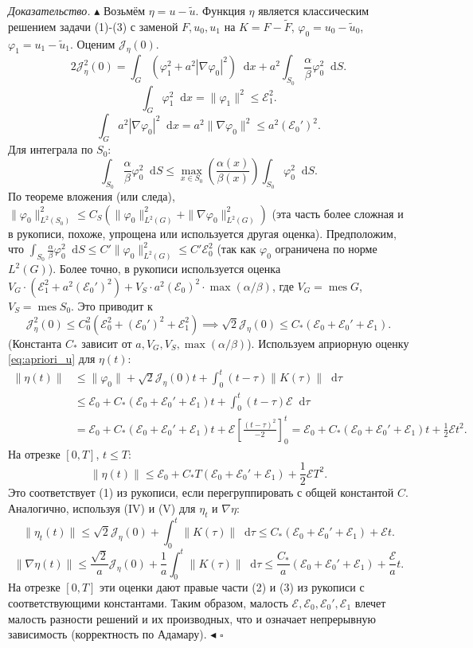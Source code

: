\documentclass[12pt, a4paper]{article}
\newcommand{\dd}{\mathop{}\!\mathrm{d}} %
\newenvironment{proof}[1][\proofname]{\par\noindent\textit{#1.}\quad}{\hfill$\square$}
\renewcommand{\proofname}{Доказательство}
\newcommand{\mes}{\operatorname{mes}} %
\begin{document}
\begin{proof}
$\blacktriangle$ Возьмём $\eta = u - \tilde{u}$. Функция $\eta$ является классическим решением задачи (1)-(3) с заменой $F, u_0, u_1$ на $K = F - \tilde{F}$, $\varphi_0 = u_0 - \tilde{u}_0$, $\varphi_1 = u_1 - \tilde{u}_1$.
Оценим $\mathcal{J}_\eta(0)$.
$$ 2 \mathcal{J}_\eta^2(0) = \int_G (\varphi_1^2 + a^2 |\nabla \varphi_0|^2) \dd x + a^2 \int_{S_0} \frac{\alpha}{\beta} \varphi_0^2 \dd S. $$
$$ \int_G \varphi_1^2 \dd x = \|\varphi_1\|^2 \le \mathcal{E}_1^2. $$
$$ \int_G a^2 |\nabla \varphi_0|^2 \dd x = a^2 \|\nabla \varphi_0\|^2 \le a^2 (\mathcal{E}_0')^2. $$
Для интеграла по $S_0$:
$$ \int_{S_0} \frac{\alpha}{\beta} \varphi_0^2 \dd S \le \max_{x \in S_0} \left(\frac{\alpha(x)}{\beta(x)}\right) \int_{S_0} \varphi_0^2 \dd S. $$
По теореме вложения (или следа), $\|\varphi_0\|_{L^2(S_0)}^2 \le C_S (\|\varphi_0\|_{L^2(G)}^2 + \|\nabla \varphi_0\|_{L^2(G)}^2)$ (эта часть более сложная и в рукописи, похоже, упрощена или используется другая оценка).
Предположим, что $\int_{S_0} \frac{\alpha}{\beta} \varphi_0^2 \dd S \le C' \|\varphi_0\|_{L^2(G)}^2 \le C' \mathcal{E}_0^2$ (так как $\varphi_0$ ограничена по норме $L^2(G)$).
Более точно, в рукописи используется оценка $V_G \cdot (\mathcal{E}_1^2 + a^2 (\mathcal{E}_0')^2) + V_S \cdot a^2 (\mathcal{E}_0)^2 \cdot \max (\alpha/\beta)$, где $V_G=\mes G$, $V_S=\mes S_0$.
Это приводит к
$$ \mathcal{J}_\eta^2(0) \le C_0^2 (\mathcal{E}_0^2 + (\mathcal{E}_0')^2 + \mathcal{E}_1^2) \implies \sqrt{2} \mathcal{J}_\eta(0) \le C_*( \mathcal{E}_0 + \mathcal{E}_0' + \mathcal{E}_1). $$
(Константа $C_*$ зависит от $a, V_G, V_S, \max(\alpha/\beta)$).
Используем априорную оценку \eqref{eq:apriori_u} для $\eta(t)$:
\begin{align*}
\|\eta(t)\| &\le \|\varphi_0\| + \sqrt{2} \mathcal{J}_\eta(0) t + \int_0^t (t-\tau) \|K(\tau)\| \dd\tau \\
&\le \mathcal{E}_0 + C_*(\mathcal{E}_0 + \mathcal{E}_0' + \mathcal{E}_1) t + \int_0^t (t-\tau) \mathcal{E} \dd\tau \\
&= \mathcal{E}_0 + C_*(\mathcal{E}_0 + \mathcal{E}_0' + \mathcal{E}_1) t + \mathcal{E} \left[ \frac{(t-\tau)^2}{-2} \right]_0^t = \mathcal{E}_0 + C_*(\mathcal{E}_0 + \mathcal{E}_0' + \mathcal{E}_1) t + \frac{1}{2} \mathcal{E} t^2.
\end{align*}
На отрезке $[0,T]$, $t \le T$:
$$ \|\eta(t)\| \le \mathcal{E}_0 + C_* T (\mathcal{E}_0 + \mathcal{E}_0' + \mathcal{E}_1) + \frac{1}{2} \mathcal{E} T^2. $$
Это соответствует (1) из рукописи, если перегруппировать с общей константой $C$.
Аналогично, используя (IV) и (V) для $\eta_t$ и $\nabla \eta$:
$$ \|\eta_t(t)\| \le \sqrt{2} \mathcal{J}_\eta(0) + \int_0^t \|K(\tau)\| \dd\tau \le C_*(\mathcal{E}_0 + \mathcal{E}_0' + \mathcal{E}_1) + \mathcal{E} t. $$
$$ \|\nabla \eta(t)\| \le \frac{\sqrt{2}}{a} \mathcal{J}_\eta(0) + \frac{1}{a} \int_0^t \|K(\tau)\| \dd\tau \le \frac{C_*}{a}(\mathcal{E}_0 + \mathcal{E}_0' + \mathcal{E}_1) + \frac{\mathcal{E}}{a} t. $$
На отрезке $[0,T]$ эти оценки дают правые части (2) и (3) из рукописи с соответствующими константами.
Таким образом, малость $\mathcal{E}, \mathcal{E}_0, \mathcal{E}_0', \mathcal{E}_1$ влечет малость разности решений и их производных, что и означает непрерывную зависимость (корректность по Адамару). $\blacktriangleleft$
\end{proof}
\end{document}
